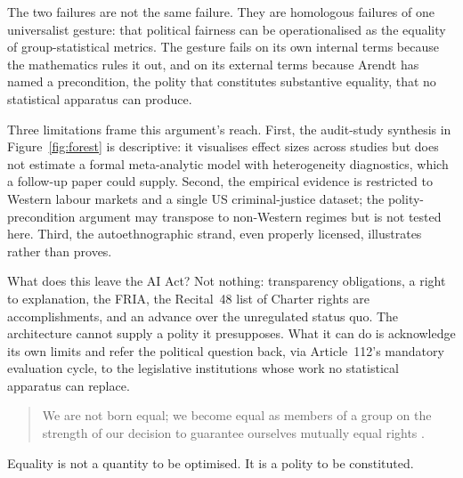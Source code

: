 \documentclass[12pt]{article}
\begin{document}
The two failures are not the same failure. They are homologous failures of one universalist gesture: that political fairness can be operationalised as the equality of group-statistical metrics. The gesture fails on its own internal terms because the mathematics rules it out, and on its external terms because Arendt has named a precondition, the polity that constitutes substantive equality, that no statistical apparatus can produce.

Three limitations frame this argument's reach. First, the audit-study synthesis in Figure~\ref{fig:forest} is descriptive: it visualises effect sizes across studies but does not estimate a formal meta-analytic model with heterogeneity diagnostics, which a follow-up paper could supply. Second, the empirical evidence is restricted to Western labour markets and a single US criminal-justice dataset; the polity-precondition argument may transpose to non-Western regimes but is not tested here. Third, the autoethnographic strand, even properly licensed, illustrates rather than proves.

What does this leave the AI Act? Not nothing: transparency obligations, a right to explanation, the FRIA, the Recital~48 list of Charter rights are accomplishments, and an advance over the unregulated status quo. The architecture cannot supply a polity it presupposes. What it can do is acknowledge its own limits and refer the political question back, via Article~112's mandatory evaluation cycle, to the legislative institutions whose work no statistical apparatus can replace.

\begin{quote}
\noindent
We are not born equal; we become equal as members of a group on the strength of our decision to guarantee ourselves mutually equal rights \citep[p.~301]{arendt1951}.
\end{quote}

\noindent Equality is not a quantity to be optimised. It is a polity to be constituted.


\end{document}
